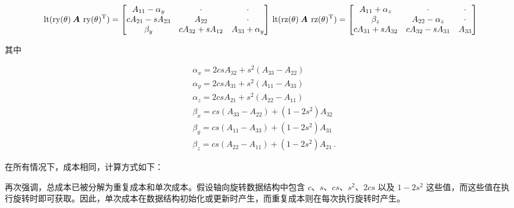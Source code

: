 \documentclass[10pt,a4paper]{book}
\theoremstyle{thmstyle} %
\theoremstyle{defstyle} %
\theoremstyle{prostyle} %
\begin{document}
$$
\operatorname{lt}(\operatorname{ry}(\theta)\:\boldsymbol{A}\:\operatorname{ry}(\theta)^\mathrm{T})=\begin{bmatrix}A_{11}-\alpha_y&\cdot&\cdot\\cA_{21}-sA_{23}&A_{22}&\cdot\\\beta_y&cA_{32}+sA_{12}&A_{33}+\alpha_y\end{bmatrix}\\\operatorname{lt}(\operatorname{rz}(\theta)\:\boldsymbol{A}\:\operatorname{rz}(\theta)^\mathrm{T})=\begin{bmatrix}A_{11}+\alpha_z&\cdot&\cdot\\\beta_z&A_{22}-\alpha_z&\cdot\\cA_{31}+sA_{32}&cA_{32}-sA_{31}&A_{33}\end{bmatrix}
$$



其中



$$
\begin{array}{rl} & { \alpha _ { x } = 2 c s A _ { 32 } + s ^{2} ( A _ { 33 } - A _ { 22 } ) } \\& { \alpha _ { y } = 2 c s A _ { 31 } + s ^{2} ( A _ { 11 } - A _ { 33 } ) } \\& { \alpha _ { z } = 2 c s A _ { 21 } + s ^{2} ( A _ { 22 } - A _ { 11 } ) } \\& { \beta _ { x } = c s ( A _ { 33 } - A _ { 22 } ) + ( 1 - 2 s ^{2} ) A _ { 32 } } \\& { \beta _ { y } = c s ( A _ { 11 } - A _ { 33 } ) + ( 1 - 2 s ^{2} ) A _ { 31 } } \\& { \beta _ { z } = c s ( A _ { 22 } - A _ { 11 } ) + ( 1 - 2 s ^{2} ) A _ { 21 } \, . } \end{array}
$$



在所有情况下，成本相同，计算方式如下：





再次强调，总成本已被分解为重复成本和单次成本。假设轴向旋转数据结构中包含 $c$、$s$、$cs$、$s^2$、$2cs$ 以及 $1-2s^2$ 这些值，而这些值在执行旋转时即可获取。因此，单次成本在数据结构初始化或更新时产生，而重复成本则在每次执行旋转时产生。
\end{document}
